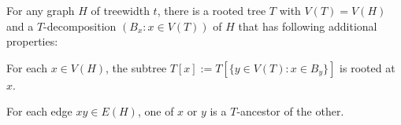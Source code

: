 \documentclass{patmorin}
\newcommand{\tlabel}[1]{\label{t:#1}}
\begin{document}
\begin{lem}
  For any graph $H$ of treewidth $t$, there is a rooted tree $T$ with $V(T)=V(H)$ and a $T$-decomposition $(B_x:x\in V(T))$ of $H$ that has following additional properties:  
  \begin{compactenum}[(T1)]
    \item\tlabel{subtree-root} For each $x\in V(H)$, the subtree $T[x]:=T[\{y\in V(T):x\in B_y\}]$ is rooted at $x$.
    \item\tlabel{ancestor-edge}\tlabel{last} For each edge $xy\in E(H)$, one of $x$ or $y$ is a $T$-ancestor of the other.
  \end{compactenum}
\end{lem}
\end{document}
